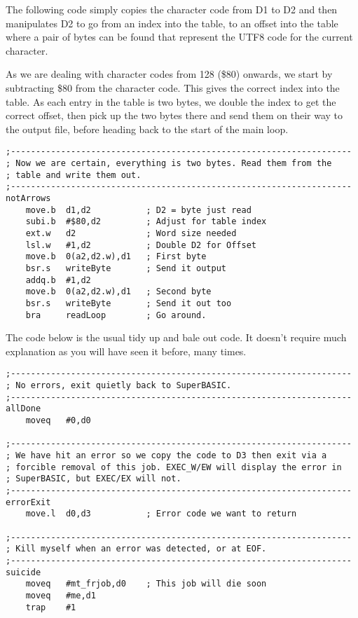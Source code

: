 The following code simply copies the character code from D1 to D2
and then manipulates D2 to go from an index into the table, to an
offset into the table where a pair of bytes can be found that represent
the UTF8 code for the current character. 

As we are dealing with character codes from 128 (\$80) onwards, we
start by subtracting \$80 from the character code. This gives the
correct index into the table. As each entry in the table is two bytes,
we double the index to get the correct offset, then pick up the two
bytes there and send them on their way to the output file, before
heading back to the start of the main loop.

\begin{lstlisting}[firstnumber=last,caption={Ql2utf8: Two byte characters}]
;--------------------------------------------------------------------
; Now we are certain, everything is two bytes. Read them from the
; table and write them out.
;--------------------------------------------------------------------
notArrows
    move.b  d1,d2           ; D2 = byte just read
    subi.b  #$80,d2         ; Adjust for table index
    ext.w   d2              ; Word size needed
    lsl.w   #1,d2           ; Double D2 for Offset
    move.b  0(a2,d2.w),d1   ; First byte
    bsr.s   writeByte       ; Send it output
    addq.b  #1,d2
    move.b  0(a2,d2.w),d1   ; Second byte
    bsr.s   writeByte       ; Send it out too
    bra     readLoop        ; Go around.
\end{lstlisting}

The code below is the usual tidy up and bale out code. It doesn't
require much explanation as you will have seen it before, many times.

\begin{lstlisting}[firstnumber=last,caption={Ql2utf8: Clean up and exit handling}]
;--------------------------------------------------------------------
; No errors, exit quietly back to SuperBASIC.
;--------------------------------------------------------------------
allDone
    moveq   #0,d0

;--------------------------------------------------------------------
; We have hit an error so we copy the code to D3 then exit via a
; forcible removal of this job. EXEC_W/EW will display the error in
; SuperBASIC, but EXEC/EX will not.
;--------------------------------------------------------------------
errorExit
    move.l  d0,d3           ; Error code we want to return

;--------------------------------------------------------------------
; Kill myself when an error was detected, or at EOF.
;--------------------------------------------------------------------
suicide
    moveq   #mt_frjob,d0    ; This job will die soon
    moveq   #me,d1
    trap    #1
\end{lstlisting}


